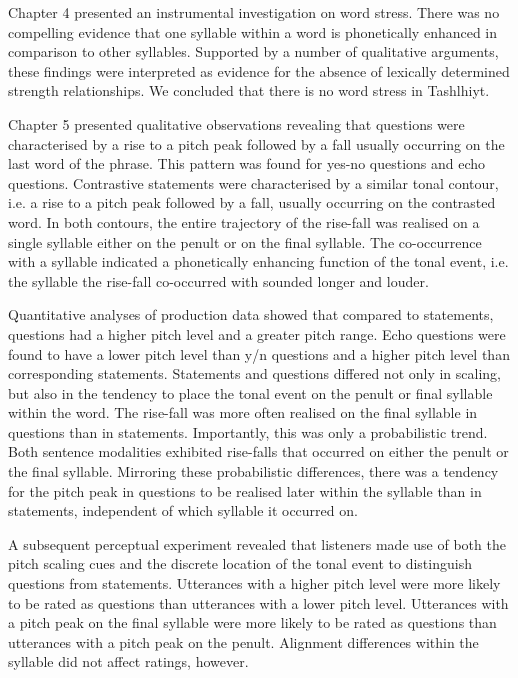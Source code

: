 Chapter 4 presented an instrumental investigation on word stress. There was no compelling evidence that one syllable within a word is phonetically enhanced in comparison to other syllables. Supported by a number of qualitative arguments, these findings were interpreted as evidence for the absence of lexically determined strength relationships. We concluded that there is no word stress in Tashlhiyt.

Chapter 5 presented qualitative observations revealing that questions were characterised by a rise to a pitch peak followed by a fall usually occurring on the last word of the phrase. This pattern was found for yes-no questions and echo questions. Contrastive statements were characterised by a similar tonal contour, i.e. a rise to a pitch peak followed by a fall, usually occurring on the contrasted word. In both contours, the entire trajectory of the rise-fall was realised on a single syllable either on the penult or on the final syllable. The co-occurrence with a syllable indicated a phonetically enhancing function of the tonal event, i.e. the syllable the rise-fall co-occurred with sounded longer and louder. 

Quantitative analyses of production data showed that compared to statements, questions had a higher pitch level and a greater pitch range. Echo questions were found to have a lower pitch level than y/n questions and a higher pitch level than corresponding statements. Statements and questions differed not only in scaling, but also in the tendency to place the tonal event on the penult or final syllable within the word. The rise-fall was more often realised on the final syllable in questions than in statements. Importantly, this was only a probabilistic trend. Both sentence modalities exhibited rise-falls that occurred on either the penult or the final syllable. Mirroring these probabilistic differences, there was a tendency for the pitch peak in questions to be realised later within the syllable than in statements, independent of which syllable it occurred on. 

A subsequent perceptual experiment revealed that listeners made use of both the pitch scaling cues and the discrete location of the tonal event to distinguish questions from statements. Utterances with a higher pitch level were more likely to be rated as questions than utterances with a lower pitch level. Utterances with a pitch peak on the final syllable were more likely to be rated as questions than utterances with a pitch peak on the penult. Alignment differences within the syllable did not affect ratings, however.

